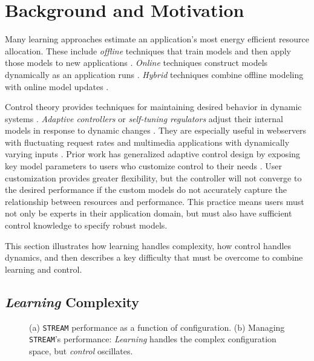 \section{Background and Motivation}
\label{sec:example}
Many learning approaches estimate an application's most energy
efficient resource allocation.  These include \emph{offline}
techniques that train models and then apply those models to new
applications
\cite{Yi2003,LeeBrooks2006,CPR,reddiHPCA2013,PUPiL,quasar}.
\emph{Online} techniques construct models dynamically as an
application runs
\cite{Li2006,Flicker,ParallelismDial,Ponamarev,LeeBrooks}.
\emph{Hybrid} techniques combine offline modeling with online model
updates \cite{packandcap,Winter2010,dubach2010,Koala,Cinder,
  wu2012inferred,LEO}.

Control theory provides techniques for maintaining desired behavior in
dynamic systems \cite{Hellerstein2004a}. \emph{Adaptive controllers}
or \emph{self-tuning regulators} adjust their internal models in
response to dynamic changes \cite{HandbookControl}. They are
especially useful in webservers with fluctuating request rates
\cite{Horvarth,LuEtAl-2006a,SunDaiPan-2008a} and multimedia
applications with dynamically varying inputs
\cite{TCST,Agilos,grace2}.  Prior work has generalized adaptive
control design by exposing key model parameters to users who customize
control to their needs \cite{ControlWare,POET}.  User customization
provides greater flexibility, but the controller will not converge to
the desired performance if the custom models do not accurately capture
the relationship between resources and performance.  This practice
means users must not only be experts in their application domain, but
must also have sufficient control knowledge to specify robust models.

This section illustrates how learning handles complexity, how control
handles dynamics, and then describes a key difficulty that must be
overcome to combine learning and control.

\subsection{\emph{Learning} Complexity}
\begin{figure}
\centering
  \subfloat[]
  {
    
    \label{fig:STREAM_timeline}
  }
  \caption{(a) \texttt{STREAM} performance as a function of
    configuration.  (b) Managing \texttt{STREAM}'s performance:
    \emph{Learning} handles the complex configuration space, but
    \emph{control} oscillates.}
  \label{fig:learning-models1}
\end{figure}

